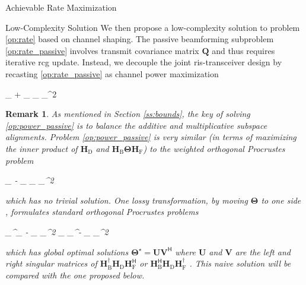 \documentclass[journal]{IEEEtran}
\newtheorem{remark}{Remark}
\begin{document}
\begin{section}{Achievable Rate Maximization}
	\begin{subsection}{Low-Complexity Solution}
		We then propose a low-complexity solution to problem \eqref{op:rate} based on channel shaping.
		The passive beamforming subproblem \eqref{op:rate_passive} involves transmit covariance matrix $\mathbf{Q}$ and thus requires iterative \gls{rcg} update.
		Instead, we decouple the joint \gls{ris}-transceiver design by recasting \eqref{op:rate_passive} as channel power maximization
		\begin{maxi!}
			{\scriptstyle{\mathbf{\Theta}}}{\lVert {}_ + _ \mathbf{\Theta} _ \rVert _^2}{\label{op:power_passive}}{\label{ob:power_passive}}
		\end{maxi!}
		\begin{remark}
			As mentioned in Section \ref{ss:bounds}, the key of solving \eqref{op:power_passive} is to balance the additive and multiplicative subspace alignments.
			Problem \eqref{op:power_passive} is very similar (in terms of maximizing the inner product of $\mathbf{H}_\mathrm{D}$ and $\mathbf{H}_\mathrm{B} \mathbf{\Theta} \mathbf{H}_\mathrm{F}$) to the weighted orthogonal Procrustes problem \cite{Gower2004}
			\begin{mini!}
				{\scriptstyle{\mathbf{\Theta}}}{\lVert {}_ - _ \mathbf{\Theta} _\mathrm{F} \rVert _^2}{\label{op:weighted_orthogonal_procrustes}}{}
			\end{mini!}
			which has no trivial solution.
			One lossy transformation, by moving $\mathbf{\Theta}$ to one side \cite{Bell2003}, formulates standard orthogonal Procrustes problems
			\begin{mini!}
				{\scriptstyle{\mathbf{\Theta}}}{\lVert {}_^\dagger {}_ - \mathbf{\Theta} _\mathrm{F} \rVert _^2  \lVert \mathbf{H}_ _^\dagger - _ \mathbf{\Theta} \rVert _^2}{\label{op:standard_orthogonal_procrustes}}{}
				\addConstraint{\mathbf{\Theta}^\mathsf{H} \mathbf{\Theta}=\mathbf{I},}{}{}
			\end{mini!}
			which has global optimal solutions $\mathbf{\Theta}^\star = \mathbf{U} \mathbf{V}^\mathsf{H}$ where $\mathbf{U}$ and $\mathbf{V}$ are the left and right singular matrices of $\mathbf{H}_\mathrm{B}^\dagger \mathbf{H}_\mathrm{D} \mathbf{H}_\mathrm{F}^\mathsf{H}$ or $\mathbf{H}_\mathrm{B}^\mathsf{H} \mathbf{H}_\mathrm{D} \mathbf{H}_\mathrm{F}^\dagger$ \cite{Golub2013}.
			This naive solution will be compared with the one proposed below.
		\end{remark}


\end{subsection}
\end{section}
\end{document}
